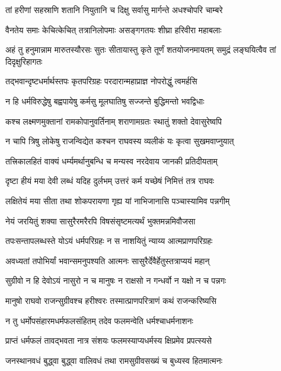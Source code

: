 \twolineshloka
{तां हरीणां सहस्राणि शतानि नियुतानि च}
{दिक्षु सर्वासु मार्गन्ते अधश्चोपरि चाम्बरे} %

\twolineshloka
{वैनतेय समाः केचित्केचित् तत्रानिलोपमाः}
{असङ्गगतयः शीघ्रा हरिवीरा महाबलाः} %

\threelineshloka
{अहं तु हनुमान्नाम मारुतस्यौरसः सुतः}
{सीतायास्तु कृते तूर्णं शतयोजनमायतम्}
{समुद्रं लङ्घयित्वैव तां दिदृक्षुरिहागतः} %

\twolineshloka
{तद्भवान्दृष्टधर्मार्थस्तपः कृतपरिग्रहः}
{परदारान्महाप्राज्ञ नोपरोद्धुं त्वमर्हसि} %

\twolineshloka
{न हि धर्मविरुद्धेषु बह्वपायेषु कर्मसु}
{मूलघातिषु सज्जन्ते बुद्धिमन्तो भवद्विधाः} %

\twolineshloka
{कश्च लक्ष्मणमुक्तानां रामकोपानुवर्तिनाम्}
{शराणामग्रतः स्थातुं शक्तो देवासुरेष्वपि} %

\twolineshloka
{न चापि त्रिषु लोकेषु राजन्विद्येत कश्चन}
{राघवस्य व्यलीकं यः कृत्वा सुखमवाप्नुयात्} %

\twolineshloka
{तत्त्रिकालहितं वाक्यं धर्म्यमर्थानुबन्धि च}
{मन्यस्व नरदेवाय जानकी प्रतिदीयताम्} %

\twolineshloka
{दृष्टा हीयं मया देवी लब्धं यदिह दुर्लभम्}
{उत्तरं कर्म यच्छेषं निमित्तं तत्र राघवः} %

\twolineshloka
{लक्षितेयं मया सीता तथा शोकपरायणा}
{गृह्य यां नाभिजानासि पञ्चास्यामिव पन्नगीम्} %

\twolineshloka
{नेयं जरयितुं शक्या सासुरैरमरैरपि}
{विषसंसृष्टमत्यर्थं भुक्तमन्नमिवौजसा} %

\twolineshloka
{तपःसन्तापलब्धस्ते योऽयं धर्मपरिग्रहः}
{न स नाशयितुं न्याय्य आत्मप्राणपरिग्रहः} %

\twolineshloka
{अवध्यतां तपोभिर्यां भवान्समनुपश्यति}
{आत्मनः सासुरैर्देवैर्हेतुस्तत्राप्ययं महान्} %

\twolineshloka
{सुग्रीवो न हि देवोऽयं नासुरो न च मानुषः}
{न राक्षसो न गन्धर्वो न यक्षो न च पन्नगः} %

\twolineshloka
{मानुषो राघवो राजन्सुग्रीवश्च हरीश्वरः}
{तस्मात्प्राणपरित्राणं कथं राजन्करिष्यसि} %

\twolineshloka
{न तु धर्मोपसंहारमधर्मफलसंहितम्}
{तदेव फलमन्वेति धर्मश्चाधर्मनाशनः} %

\twolineshloka
{प्राप्तं धर्मफलं तावद्भवता नात्र संशयः}
{फलमस्याप्यधर्मस्य क्षिप्रमेव प्रपत्स्यसे} %

\twolineshloka
{जनस्थानवधं बुद्ध्वा बुद्ध्वा वालिवधं तथा}
{रामसुग्रीवसख्यं च बुध्यस्व हितमात्मनः} %

